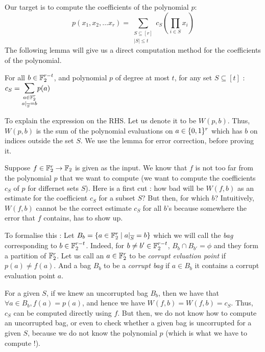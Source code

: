 Our target is to compute the coefficients of the polynomial $p$:
$$ p(x_1, x_2, \ldots x_r) = \sum_{\substack{S \subseteq [r]\\ |S| \le t}} c_S \left( \prod_{i \in S} x_i \right)$$
The following lemma will give us a direct computation method for the coefficients of the polynomial.
\begin{lemma}
\label{lem:reed-sum}
For all $b \in {\mathbb{F}}_2^{r-t}$, and polynomial $p$ of degree at most $t$, for any set $S \subseteq [t]$ :
$ c_S = \bigsum_{\substack{a \in \F_2^r \\ a|_{\overline{S}} = b}} p(a) $
\end{lemma}

\noindent To explain the expression on the RHS. Let us denote it to be $W(p,b)$. Thus, $W(p,b)$ is the sum of the polynomial evaluations on $a \in \{0,1\}^r$ which has $b$ on indices outside the set $S$.
We use the lemma for error correction, before proving it.

\noindent Suppose $f \in {\mathbb{F}}_2^r \to {\mathbb{F}}_2$ is given as the input. We know that $f$ is not too far from the polynomial $p$ that we want to compute (we want to compute the coefficients $c_S$ of $p$ for differnet sets $S$). Here is a first cut : how bad will be $W(f,b)$ as an estimate for the coefficient $c_S$ for a subset $S$? But then, for which $b$? Intuitively, $W(f,b)$ cannot be the correct estimate $c_S$ for all $b$'s because somewhere the error that $f$ contains, has to show up.

To formalise this : Let $B_b = \{ a \in {\mathbb{F}}_2^r \mid a|_{\overline{S}} = b \}$ which we will call the \textit{bag} corresponding to $b \in {\mathbb{F}}_2^{r-t}$. Indeed, for $b \ne b' \in {\mathbb{F}}_2^{r-t}$, $B_b \cap B_{b'} = \phi$ and they form a partition of ${\mathbb{F}}_2^r$. Let us call an $a \in {\mathbb{F}}_2^r$ to be \textit{corrupt evluation point} if $p(a) \ne f(a)$. And a bag $B_b$ to be a {\em corrupt bag} if $a \in B_b$ it contains a corrupt evaluation point $a$.

For a given $S$, if we knew an uncorrupted bag $B_b$, then we have that $\forall a \in B_b, f(a) = p(a)$, and hence we have $W(f,b) = W(f,b) = c_S$. Thus, $c_S$ can be computed directly using $f$. But then, we do not know how to compute an uncorrupted bag, or even to check whether a given bag is uncorrupted for a given $S$, because we do not know the polynomial $p$ (which is what we have to compute !).

